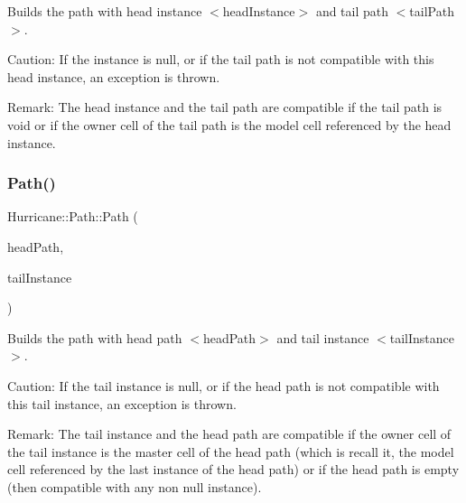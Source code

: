 Builds the path with head instance {\ttfamily $<$head\+Instance$>$} and tail path {\ttfamily $<$tail\+Path$>$}.

\begin{DoxyParagraph}{Caution\+: If the instance is null, or if the tail path is not }
compatible with this head instance, an exception is thrown.
\end{DoxyParagraph}
\begin{DoxyParagraph}{Remark\+: The head instance and the tail path are compatible if the }
tail path is void or if the owner cell of the tail path is the model cell referenced by the head instance. 
\end{DoxyParagraph}
\mbox{\label{classHurricane_1_1Path_add5812ab3bb9a4cf6dbe49d1e4e932cb}} 
\subsubsection{\texorpdfstring{Path()}{Path()}\hspace{0.1cm}{\footnotesize\ttfamily [4/6]}}
{\footnotesize\ttfamily Hurricane\+::\+Path\+::\+Path (\begin{DoxyParamCaption}\item[{const \mbox{\hyperlink{classHurricane_1_1Path}{Path}} \&}]{head\+Path,  }\item[{\mbox{\hyperlink{classHurricane_1_1Instance}{Instance}} $\ast$}]{tail\+Instance }\end{DoxyParamCaption})}

Builds the path with head path {\ttfamily $<$head\+Path$>$} and tail instance {\ttfamily $<$tail\+Instance$>$}.

\begin{DoxyParagraph}{Caution\+: If the tail instance is null, or if the head path is not }
compatible with this tail instance, an exception is thrown.
\end{DoxyParagraph}
\begin{DoxyParagraph}{Remark\+: The tail instance and the head path are compatible if the }
owner cell of the tail instance is the master cell of the head path (which is recall it, the model cell referenced by the last instance of the head path) or if the head path is empty (then compatible with any non null instance). 
\end{DoxyParagraph}
\mbox{\label{classHurricane_1_1Path_a6e3d331f5c5a0dcb91d10516a4beb6bc}} 
